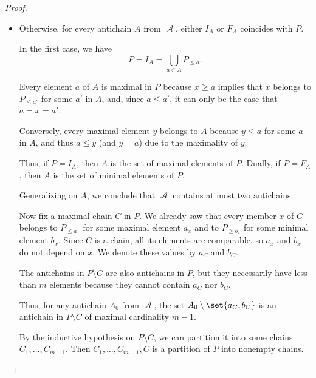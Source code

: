 \begin{proof}
\begin{itemize}
    Denote the chain in \( \mscrI_{A_0} \) corresponding to \( a \) by \( I_a \), and similarly for \( \mscrF_{A_0} \) and \( F_a \). To obtain a partition of \( P \) into \( m \) chains, it remains to connect \( I_a \) to \( F_a \) for each \( a \) in \( A \).

    \item Otherwise, for every antichain \( A \) from \( \mscrA \), either \( I_A \) or \( F_A \) coincides with \( P \).

    In the first case, we have
    \begin{equation*}
      P = I_A = \bigcup_{a \in A} P_{\leq a}.
    \end{equation*}

    Every element \( a \) of \( A \) is maximal in \( P \) because \( x \geq a \) implies that \( x \) belongs to \( P_{\leq a'} \) for some \( a' \) in \( A \), and, since \( a \leq a' \), it can only be the case that \( a = x = a' \).

    Conversely, every maximal element \( y \) belongs to \( A \) because \( y \leq a \) for some \( a \) in \( A \), and thus \( a \leq y \) (and \( y = a \)) due to the maximality of \( y \).

    Thus, if \( P = I_A \), then \( A \) is the set of maximal elements of \( P \). Dually, if \( P = F_A \), then \( A \) is the set of minimal elements of \( P \).

    Generalizing on \( A \), we conclude that \( \mscrA \) contains at most two antichains.

    Now fix a maximal chain \( C \) in \( P \). We already saw that every member \( x \) of \( C \) belongs to \( P_{\leq a_x} \) for some maximal element \( a_x \) and to \( P_{\geq b_x} \) for some minimal element \( b_x \). Since \( C \) is a chain, all its elements are comparable, so \( a_x \) and \( b_x \) do not depend on \( x \). We denote these values by \( a_C \) and \( b_C \).

    The antichains in \( P \setminus C \) are also antichains in \( P \), but they necessarily have less than \( m \) elements because they cannot contain \( a_C \) nor \( b_C \).

    Thus, for any antichain \( A_0 \) from \( \mscrA \), the set \( A_0 \setminus \set{ a_C, b_C } \) is an antichain in \( P \setminus C \) of maximal cardinality \( m - 1 \).

    By the inductive hypothesis on \( P \setminus C \), we can partition it into some chains \( C_1, \ldots, C_{m-1} \). Then \( C_1, \ldots, C_{m-1}, C \) is a partition of \( P \) into nonempty chains.
  \end{itemize}


\end{proof}
